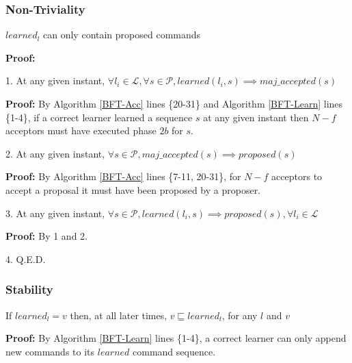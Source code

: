 \subsubsection{Non-Triviality}
\begin{theorem}
$learned_l$ can only contain proposed commands \label{N-T1} \par
\end{theorem} 
\textbf{Proof:} \par
\parbox{\linewidth}{\strut1. At any given instant, $\forall l_i \in \mathcal{L}, \forall s \in \mathcal{P}, learned(l_i,s) \implies maj\_accepted(s)$ }\par
\indent\indent\parbox{\linewidth}{\strut\textbf{Proof:} By Algorithm \ref{BFT-Acc} lines \{20-31\} and Algorithm \ref{BFT-Learn} lines \{1-4\}, if a correct learner learned a sequence $s$ at any given instant then $N-f$ acceptors must have executed phase $2b$ for $s$.}\par
\parbox{\linewidth}{\strut2. At any given instant, $\forall s \in \mathcal{P}, maj\_accepted(s) \implies proposed(s)$ }\par
\indent\indent\parbox{\linewidth}{\strut\textbf{Proof:} By Algorithm \ref{BFT-Acc} lines \{7-11, 20-31\}, for $N-f$ acceptors to accept a proposal it must have been proposed by a proposer.}\par
\parbox{\linewidth}{\strut3. At any given instant, $\forall s \in \mathcal{P}, learned(l_i,s) \implies proposed(s),\forall l_i \in \mathcal{L}$}\par
\indent\indent\parbox{\linewidth}{\strut\textbf{Proof:} By 1 and 2.}\par
\parbox{\linewidth}{\strut4. Q.E.D.}\par

\subsubsection{Stability}
\begin{theorem}
If $learned_l = v$ then, at all later times, $v \sqsubseteq learned_l$, for any $l$ and $v$ \par \label{S-T1}
\end{theorem} 
\textbf{Proof:} By Algorithm \ref{BFT-Learn} lines \{1-4\}, a correct learner can only append new commands to its $learned$ command sequence.

